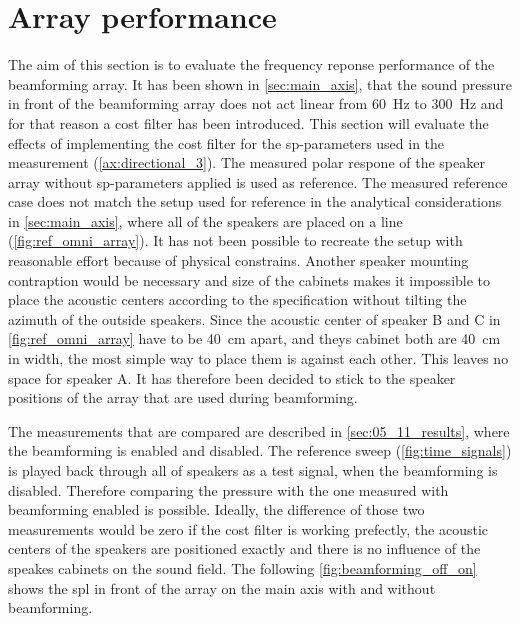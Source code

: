 \section{Array performance} \label{sec:beamforming_array_spl}

The aim of this section is to evaluate the frequency reponse performance of the beamforming array. It has been shown in \autoref{sec:main_axis}, that the sound pressure in front of the beamforming array does not act linear from \SI{60}{\hertz} to \SI{300}{\hertz} and for that reason a cost filter has been introduced. This section will evaluate the effects of implementing the cost filter for the \gls{sp}-parameters used in the measurement (\autoref{ax:directional_3}). The measured polar respone of the speaker array without \gls{sp}-parameters applied is used as reference. 
The measured reference case does not match the setup used for reference in the analytical considerations in \autoref{sec:main_axis}, where all of the speakers are placed on a line (\autoref{fig:ref_omni_array}). It has not been possible to recreate the setup with reasonable effort because of physical constrains. Another speaker mounting contraption would be necessary and size of the cabinets makes it impossible to place the acoustic centers according to the specification without tilting the azimuth of the outside speakers. Since the acoustic center of speaker B and C in \autoref{fig:ref_omni_array} have to be \SI{40}{\centi\meter} apart, and theys cabinet both are \SI{40}{\centi\meter} in width, the most simple way to place them is against each other. This leaves no space for speaker A.
It has therefore been decided to stick to the speaker positions of the array that are used during beamforming.

The measurements that are compared are described in \autoref{sec:05_11_results}, where the beamforming is enabled and disabled. The reference sweep (\autoref{fig:time_signals}) is played back through all of speakers as a test signal, when the beamforming is disabled. Therefore comparing the pressure with the one measured with beamforming enabled is possible. Ideally, the difference of those two measurements would be zero if the cost filter is working prefectly, the acoustic centers of the speakers are positioned exactly and there is no influence of the speakes cabinets on the sound field. The following \autoref{fig:beamforming_off_on} shows the \gls{spl} in front of the array on the main axis with and without beamforming.

